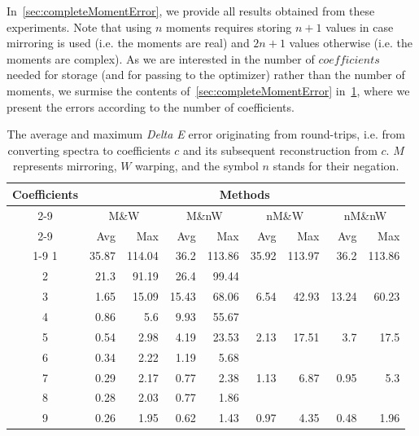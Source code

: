 In~\cref{sec:completeMomentError}, we provide all results obtained from these experiments. Note that using $n$ moments requires storing $n+1$ values in case mirroring is used (i.e. the moments are real) and $2n+1$ values otherwise (i.e. the moments are complex). As we are interested in the number of $coefficients$ needed for storage (and for passing to the optimizer) rather than the number of moments, we surmise the contents of~\cref{sec:completeMomentError} in~\cref{table:comparisonMomentTechnique}, where we present the errors according to the number of coefficients.

\begin{table}[t]
	\centering
	\begin{tabular}{crrrrrrrr}
		\toprule
		\multirow{4}{*}{Coefficients} &
		\multicolumn{8}{c}{Methods} \\
		\cmidrule(lr){2-9}
		&\multicolumn{2}{c}{M\&W} &
		\multicolumn{2}{c}{M\&nW} &
		\multicolumn{2}{c}{nM\&W} &
		\multicolumn{2}{c}{nM\&nW}\\
		\cmidrule(lr){2-9}
		& Avg & Max & Avg & Max & Avg & Max & Avg & Max \\
		\cmidrule(lr){1-9}
		1&35.87&114.04&36.2&113.86&35.92&113.97&36.2&113.86\\
		2&21.3&91.19&26.4&99.44&\textemdash&\textemdash&\textemdash&\textemdash\\
		3&1.65&15.09&15.43&68.06&6.54&42.93&13.24&60.23\\
		4&0.86&5.6&9.93&55.67&\textemdash&\textemdash&\textemdash&\textemdash\\
		5&0.54&2.98&4.19&23.53&2.13&17.51&3.7&17.5\\
		6&0.34&2.22&1.19&5.68&\textemdash&\textemdash&\textemdash&\textemdash\\
		7&0.29&2.17&0.77&2.38&1.13&6.87&0.95&5.3\\
		8&0.28&2.03&0.77&1.86&\textemdash&\textemdash&\textemdash&\textemdash\\
		9&0.26&1.95&0.62&1.43&0.97&4.35&0.48&1.96\\
		\bottomrule
	\end{tabular}
	\caption{The average and maximum \emph{Delta E} error originating from round-trips, i.e. from converting spectra to coefficients $c$ and its subsequent reconstruction from $c$. $M$ represents mirroring, $W$ warping, and the symbol $n$ stands for their negation.}
	\label{table:comparisonMomentTechnique}
\end{table}

